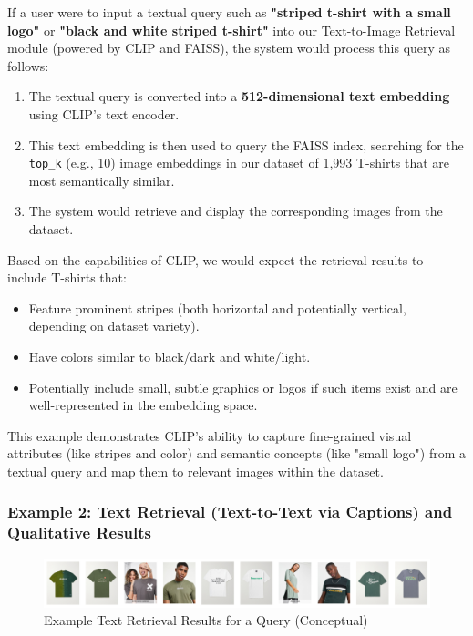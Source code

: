 \documentclass{article}
\begin{document}
If a user were to input a textual query such as \textbf{"striped t-shirt with a small logo"} or \textbf{"black and white striped t-shirt"} into our Text-to-Image Retrieval module (powered by CLIP and FAISS), the system would process this query as follows:
\begin{enumerate}
    \item The textual query is converted into a \textbf{512-dimensional text embedding} using CLIP's text encoder.
    \item This text embedding is then used to query the FAISS index, searching for the \texttt{top\_k} (e.g., 10) image embeddings in our dataset of 1,993 T-shirts that are most semantically similar.
    \item The system would retrieve and display the corresponding images from the dataset.
\end{enumerate}

Based on the capabilities of CLIP, we would expect the retrieval results to include T-shirts that:
\begin{itemize}
    \item Feature prominent stripes (both horizontal and potentially vertical, depending on dataset variety).
    \item Have colors similar to black/dark and white/light.
    \item Potentially include small, subtle graphics or logos if such items exist and are well-represented in the embedding space.
\end{itemize}
This example demonstrates CLIP's ability to capture fine-grained visual attributes (like stripes and color) and semantic concepts (like "small logo") from a textual query and map them to relevant images within the dataset.

\subsubsection{Example 2: Text Retrieval (Text-to-Text via Captions) and Qualitative Results}
\begin{figure}[H]
    \centering
    \includegraphics[width=\textwidth]{output.png}
    \caption{Example Text Retrieval Results for a Query (Conceptual)}
    \label{fig:output_retrieval}
\end{figure}
\end{document}
